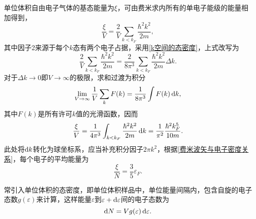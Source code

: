         单位体积自由电子气体的基态能量为$\xi$，可由费米求内所有的单电子能级的能量相加得到，
        \begin{equation}
            \frac{\xi}{V}=\frac{2}{V}\sum_{k<k_F}\frac{\hbar^2k^2}{2m},
        \end{equation}
        其中因子2来源于每个$k$态有两个电子占据，采用\autoref{k空间的态密度}，上式改写为
        \begin{equation}
            \frac{2}{V}\sum_{k<k_F}\frac{\hbar^2k^2}{2m}=\frac{2}{8\pi^3}\sum_{k<k_F}\frac{\hbar^2k^2}{2m}\Delta k.            
        \end{equation}
        对于$\Delta k\to0$即$V\to\infty$的极限，求和过渡为积分
        \begin{equation}
            \lim_{V\to\infty}\frac{1}{V}\sum_{k}F(k)=\frac{1}{8\pi^3}\int F(k)\mathop{}\!\mathrm{d} k\label{费米球内的电子的平均能量的积分过程1},
        \end{equation}
        其中$F(k)$是所有许可$k$值的光滑函数，因而
        \begin{equation}
            \frac{\xi}{V}=\frac{1}{4\pi^3}\int_{k<k_F}\frac{\hbar^2k^2}{2m}\mathop{}\!\mathrm{d} k=\frac{1}{\pi^2}\frac{\hbar^2k_F^5}{10m}\label{费米球内的电子的平均能量的积分过程2}.
        \end{equation}
        此处将$\mathop{}\!\mathrm{d} k$转化为球坐标系，应当补充积分因子$2\pi k^2$，根据\autoref{费米波矢与电子密度关系}，每个电子的平均能量为
        \begin{equation}
            \frac{\xi}{N}=\frac{3}{5}\varepsilon_F\label{电子平均能量1}.
        \end{equation}

        常引入单位体积的态密度，即单位体积样品中，单位能量间隔内，包含自旋的电子态数$g(\varepsilon)$来计算，这样能量$\varepsilon$到$\varepsilon+\mathop{}\!\mathrm{d}\varepsilon$间的电子态数为
        \begin{equation}
            \mathop{}\!\mathrm{d} N=Vg(\varepsilon)\mathop{}\!\mathrm{d}\varepsilon.
        \end{equation}

